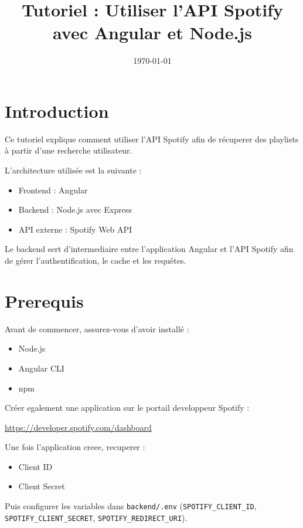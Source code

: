 \documentclass[a4paper,11pt]{article}
\title{Tutoriel : Utiliser l'API Spotify avec Angular et Node.js}
\author{}
\date{\today}
\begin{document}
\maketitle

\tableofcontents
\newpage

\section{Introduction}

Ce tutoriel explique comment utiliser l'API Spotify afin de récuperer des playlists à partir d'une recherche utilisateur.

L'architecture utilisée est la suivante :

\begin{itemize}
\item Frontend : Angular
\item Backend : Node.js avec Express
\item API externe : Spotify Web API
\end{itemize}

Le backend sert d'intermediaire entre l'application Angular et l'API Spotify afin de gérer l'authentification, le cache et les requêtes.

\section{Prerequis}

Avant de commencer, assurez-vous d'avoir installé :

\begin{itemize}
\item Node.js
\item Angular CLI
\item npm
\end{itemize}

Créer egalement une application sur le portail developpeur Spotify :

\begin{center}
\url{https://developer.spotify.com/dashboard}
\end{center}

Une fois l'application creee, recuperer :

\begin{itemize}
\item Client ID
\item Client Secret
\end{itemize}

Puis configurer les variables dans \texttt{backend/.env} (\texttt{SPOTIFY\_CLIENT\_ID}, \texttt{SPOTIFY\_CLIENT\_SECRET}, \texttt{SPOTIFY\_REDIRECT\_URI}).
\end{document}
